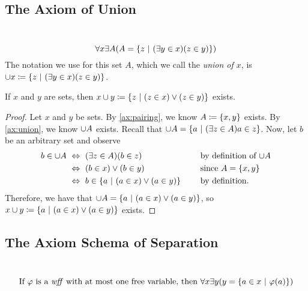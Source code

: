 \subsection{The Axiom of Union}
\begin{axiom}[Union]\label{ax:union}
    ~\vspace{-\baselineskip}
    \[
        \forall x \exists A \pn*{A = \set*{z \suchthat \pn*{\exists y \in x}\pn*{z \in y}}}
    \]
    The notation we use for this set $A$, which we call the \emph{union of $x$},
    is $\union x \defn \set*{z \suchthat \pn*{\exists y \in x}\pn*{z \in y}}$.
\end{axiom}

\begin{theorem}\label{thm:union}
    If $x$ and $y$ are sets,
    then $x \union y \defn \set*{z \suchthat \pn*{z \in x} \join \pn*{z \in y}}$ exists.
\end{theorem}
\begin{proof}
    Let $x$ and $y$ be sets.
    By \autoref{ax:pairing}, we know $A \defn \set*{x, y}$ exists.
    By \autoref{ax:union}, we know $\cup A$ exists.
    Recall that $\union A = \set*{a \suchthat \pn*{\exists z \in A}{a \in z}}$.
    Now, let $b$ be an arbitrary set and observe
    \begin{alignat*}{2}
        b \in \union A &\iff \pn*{\exists z \in A}\pn*{b \in z} &&\text{by definition of $\union A$} \\
                       &\iff (b \in x) \join (b \in y) &&\text{since $A = \set*{x, y}$} \\
                       &\iff b \in \set*{a \suchthat (a \in x) \join (a \in y)}~~~~&&\text{by definition}.
    \end{alignat*}
    Therefore, we have that $\union A = \set*{a \suchthat (a \in x) \join (a \in y)}$,
    so $x \union y \defn \set*{a \suchthat (a \in x) \join (a \in y)}$ exists.
\end{proof}

\subsection{The Axiom Schema of Separation}
\begin{axiom}[Separation]\label{ax:separation}
    ~\vspace{-\baselineskip}
    \[
        \text{If $\varphi$ is a {\wff} with at most one free variable, then }
        \forall x \exists y \pn*{y = \set*{a \in x \suchthat \varphi(a)}}
    \]
\end{axiom}

